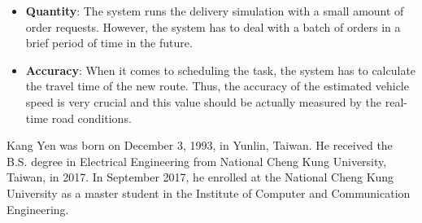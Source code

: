 \documentclass[12pt]{ksthesis}
\begin{document}
\begin{thesis}
{\begin{itemize}
\item
\textbf{Quantity}: The system runs the delivery simulation with a small amount of order requests. However, the system has to deal with a batch of orders in a brief period of time in the future.

\item
\textbf{Accuracy}: When it comes to scheduling the task, the system has to calculate the travel time of the new route. Thus, the accuracy of the estimated vehicle speed is very crucial and this value should be actually measured by the real-time road conditions.

\end{itemize}


} \end{thesis}

\singlespace {\large



}



\doublespace

\begin{vita}
\Thesisspace \large{

Kang Yen was born on December 3, 1993, in Yunlin, Taiwan.  He received the B.S. degree in Electrical Engineering from National Cheng Kung University, Taiwan, in 2017. In September 2017, he enrolled at the National Cheng Kung University as a master student in the Institute of Computer and Communication Engineering.

}\end{vita}
\end{document}
